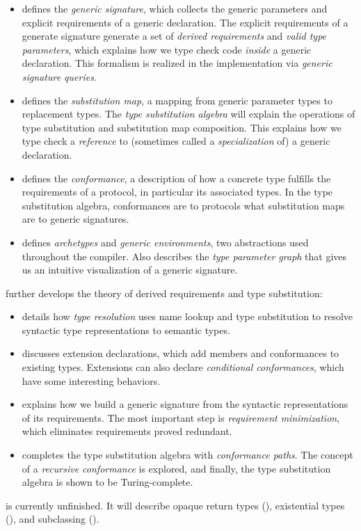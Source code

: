 \documentclass[../generics]{subfiles}
\begin{document}
\begin{itemize}
\item {} defines the \emph{generic signature}, which collects the generic parameters and explicit requirements of a generic declaration. The explicit requirements of a generate signature generate a set of \emph{derived requirements} and \emph{valid type parameters}, which explains how we type check code \emph{inside} a generic declaration. This formalism is realized in the implementation via \emph{generic signature queries}.

\item {} defines the \emph{substitution map}, a mapping from generic parameter types to replacement types. The \emph{type substitution algebra} will explain the operations of type substitution and substitution map composition. This explains how we type check a \emph{reference} to (sometimes called a \emph{specialization} of) a generic declaration.

\item {} defines the \emph{conformance}, a description of how a concrete type fulfills the requirements of a protocol, in particular its associated types. In the type substitution algebra, conformances are to protocols what substitution maps are to generic signatures.

\item {} defines \emph{archetypes} and \emph{generic environments}, two abstractions used throughout the compiler. Also describes the \emph{type parameter graph} that gives us an intuitive visualization of a generic signature.
\end{itemize}
 further develops the theory of derived requirements and type substitution:
\begin{itemize}
\item {} details how \emph{type resolution} uses name lookup and type substitution to resolve syntactic type representations to semantic types.

\item {} discusses extension declarations, which add members and conformances to existing types. Extensions can also declare \emph{conditional conformances}, which have some interesting behaviors.

\item {} explains how we build a generic signature from the syntactic representations of its requirements. The most important step is \emph{requirement minimization}, which eliminates requirements proved redundant.

\item {} completes the type substitution algebra with \emph{conformance paths}. The concept of a \emph{recursive conformance} is explored, and finally, the type substitution algebra is shown to be Turing-complete.
\end{itemize}
 is currently unfinished. It will describe opaque return types (), existential types (), and subclassing ().
\end{document}
